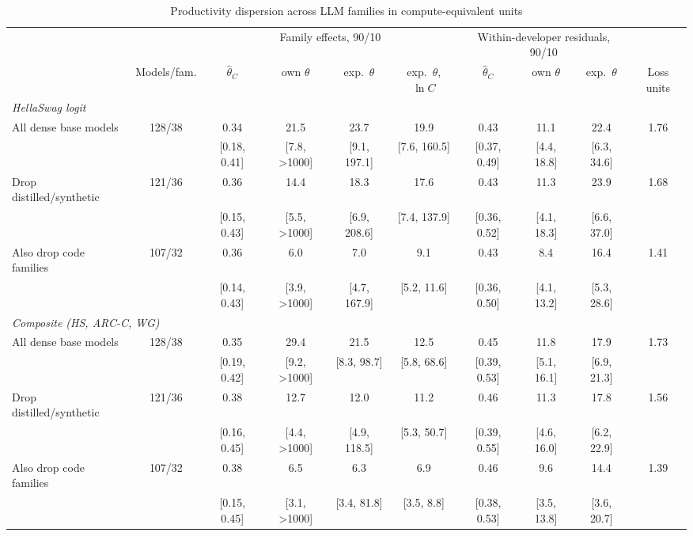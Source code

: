 \begin{table}[!htbp]
\centering
\scriptsize
\begin{threeparttable}
\caption{Productivity dispersion across LLM families in compute-equivalent units}
\label{tab:tfp_table}
\begin{tabular}{lccccccccc}
\toprule
\multicolumn{2}{c}{} & \multicolumn{4}{c}{Family effects, 90/10} & \multicolumn{3}{c}{Within-developer residuals, 90/10} & \\ \cmidrule(lr){3-6}\cmidrule(lr){7-9}
 & Models/fam. & $\hat\theta_C$ & own $\theta$ & exp.\ $\theta$ & exp.\ $\theta$, $\ln C$ & $\hat\theta_C$ & own $\theta$ & exp.\ $\theta$ & Loss units \\
\midrule
\multicolumn{10}{l}{\textit{HellaSwag logit}} \\
All dense base models & 128/38 & 0.34 & 21.5 & 23.7 & 19.9 & 0.43 & 11.1 & 22.4 & 1.76 \\
 &  & [0.18, 0.41] & [7.8, >1000] & [9.1, 197.1] & [7.6, 160.5] & [0.37, 0.49] & [4.4, 18.8] & [6.3, 34.6] &  \\
Drop distilled/synthetic & 121/36 & 0.36 & 14.4 & 18.3 & 17.6 & 0.43 & 11.3 & 23.9 & 1.68 \\
 &  & [0.15, 0.43] & [5.5, >1000] & [6.9, 208.6] & [7.4, 137.9] & [0.36, 0.52] & [4.1, 18.3] & [6.6, 37.0] &  \\
Also drop code families & 107/32 & 0.36 & 6.0 & 7.0 & 9.1 & 0.43 & 8.4 & 16.4 & 1.41 \\
 &  & [0.14, 0.43] & [3.9, >1000] & [4.7, 167.9] & [5.2, 11.6] & [0.36, 0.50] & [4.1, 13.2] & [5.3, 28.6] &  \\
\multicolumn{10}{l}{\textit{Composite (HS, ARC-C, WG)}} \\
All dense base models & 128/38 & 0.35 & 29.4 & 21.5 & 12.5 & 0.45 & 11.8 & 17.9 & 1.73 \\
 &  & [0.19, 0.42] & [9.2, >1000] & [8.3, 98.7] & [5.8, 68.6] & [0.39, 0.53] & [5.1, 16.1] & [6.9, 21.3] &  \\
Drop distilled/synthetic & 121/36 & 0.38 & 12.7 & 12.0 & 11.2 & 0.46 & 11.3 & 17.8 & 1.56 \\
 &  & [0.16, 0.45] & [4.4, >1000] & [4.9, 118.5] & [5.3, 50.7] & [0.39, 0.55] & [4.6, 16.0] & [6.2, 22.9] &  \\
Also drop code families & 107/32 & 0.38 & 6.5 & 6.3 & 6.9 & 0.46 & 9.6 & 14.4 & 1.39 \\
 &  & [0.15, 0.45] & [3.1, >1000] & [3.4, 81.8] & [3.5, 8.8] & [0.38, 0.53] & [3.5, 13.8] & [3.6, 20.7] &  \\

\end{tabular}
\end{threeparttable}
\end{table}
